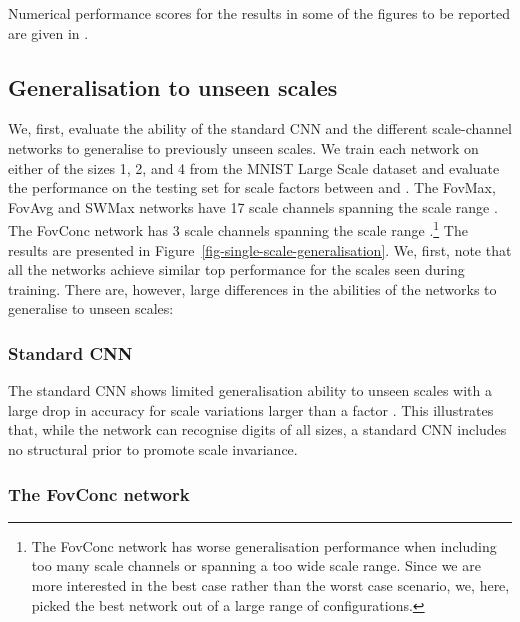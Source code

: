 \documentclass[twocolumn,runningheads]{svjour3}
\begin{document}
Numerical performance scores for the results in
some of the figures 
to be reported are given in \cite{JanLin20-arXiv}.

\subsection{Generalisation to unseen scales}

We, first, evaluate the ability of the standard CNN and the different
scale-channel networks to generalise to previously unseen scales. We
train each network on either of the sizes 1, 2, and 4 
from the MNIST Large Scale dataset and evaluate the performance 
on the testing set for scale factors between  and . 
The FovMax, FovAvg and SWMax networks have 17 scale channels spanning
the scale range . The FovConc network has 3 scale
channels spanning the scale range .\footnote{The FovConc network has worse generalisation performance when
  including too many scale channels or spanning a too wide scale
  range. Since we are more interested in the best case rather than the
  worst case scenario, we, here, picked the best network out of a
  large range of configurations.} 
The results are presented in Figure~\ref{fig-single-scale-generalisation}. 
We, first, note that all the networks achieve similar top performance for
the scales seen during training. There are, however, large differences
in the abilities of the networks to generalise to unseen scales: 

\subsubsection{Standard CNN}

The standard CNN shows limited generalisation ability to unseen scales
with a large drop in accuracy for scale variations larger than a
factor . This illustrates that, while the network can
recognise digits of all sizes, a standard CNN includes no structural
prior to promote scale invariance. 

\subsubsection{The FovConc network}
\end{document}
